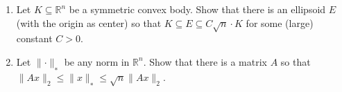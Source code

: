 \documentclass[11pt,a4paper]{article}
\renewcommand{\leq}{\leqslant}
\DeclareMathOperator{\conv}{conv}
\DeclareMathOperator{\cone}{cone}
\begin{document}
\begin{enumerate}
\item Let $K ⊆\mathbb{R}^n$ be a symmetric convex body. Show that there is an ellipsoid $E$ (with the origin as center) so that $K ⊆ E ⊆ C\sqrt{n}\cdot K$ for some (large) constant $C >0$.


\item Let $∥\cdot∥_∗$ be any norm in $\mathbb{R}^n$. Show that there is a matrix $A$ so that $∥Ax∥_2 \leq ∥x∥_∗ \leq \sqrt{n}∥Ax∥_2$.


\end{enumerate}


%
%


 
\end{document}
